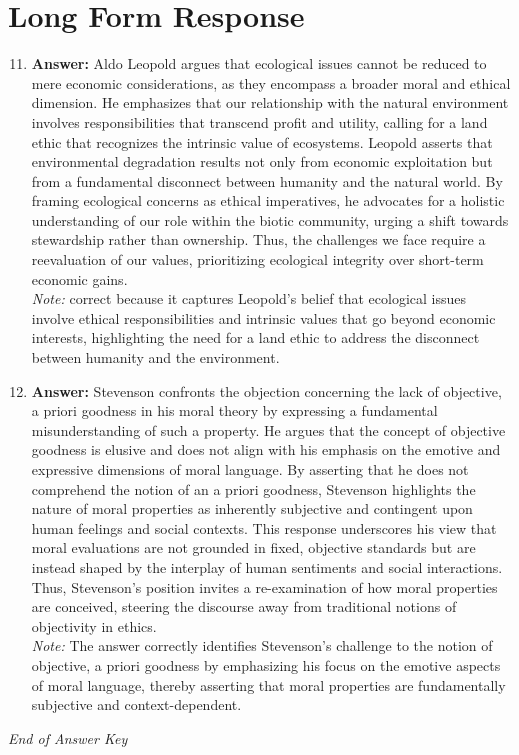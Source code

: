 \documentclass[12pt]{article}
\begin{document}
\section*{Long Form Response}
\begin{enumerate}[label=\arabic*.]
\setcounter{enumi}{10}
\item \textbf{Answer:} Aldo Leopold argues that ecological issues cannot be reduced to mere economic considerations, as they encompass a broader moral and ethical dimension. He emphasizes that our relationship with the natural environment involves responsibilities that transcend profit and utility, calling for a land ethic that recognizes the intrinsic value of ecosystems. Leopold asserts that environmental degradation results not only from economic exploitation but from a fundamental disconnect between humanity and the natural world. By framing ecological concerns as ethical imperatives, he advocates for a holistic understanding of our role within the biotic community, urging a shift towards stewardship rather than ownership. Thus, the challenges we face require a reevaluation of our values, prioritizing ecological integrity over short-term economic gains.
\\ \textit{Note:} correct because it captures Leopold's belief that ecological issues involve ethical responsibilities and intrinsic values that go beyond economic interests, highlighting the need for a land ethic to address the disconnect between humanity and the environment.
\item \textbf{Answer:} Stevenson confronts the objection concerning the lack of objective, a priori goodness in his moral theory by expressing a fundamental misunderstanding of such a property. He argues that the concept of objective goodness is elusive and does not align with his emphasis on the emotive and expressive dimensions of moral language. By asserting that he does not comprehend the notion of an a priori goodness, Stevenson highlights the nature of moral properties as inherently subjective and contingent upon human feelings and social contexts. This response underscores his view that moral evaluations are not grounded in fixed, objective standards but are instead shaped by the interplay of human sentiments and social interactions. Thus, Stevenson's position invites a re-examination of how moral properties are conceived, steering the discourse away from traditional notions of objectivity in ethics.
\\ \textit{Note:} The answer correctly identifies Stevenson's challenge to the notion of objective, a priori goodness by emphasizing his focus on the emotive aspects of moral language, thereby asserting that moral properties are fundamentally subjective and context-dependent.
\end{enumerate}

\vfill
\noindent\textit{End of Answer Key}
\end{document}
